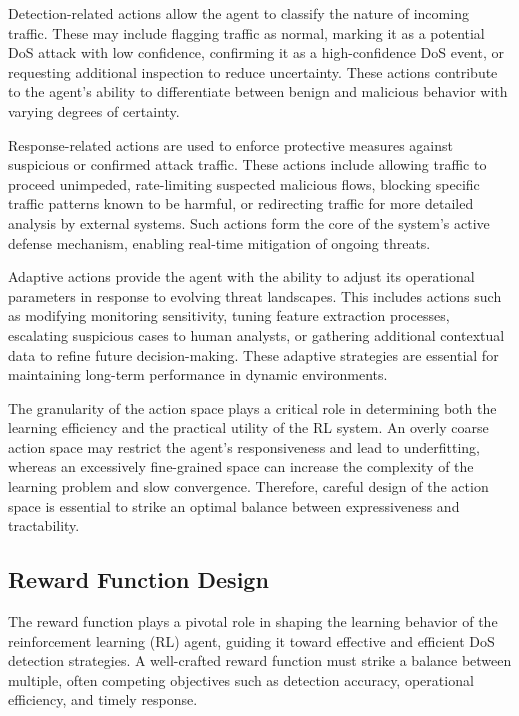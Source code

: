 \documentclass[16pt]{report}
\begin{document}
Detection-related actions allow the agent to classify the nature of incoming traffic. These may include flagging traffic as normal, marking it as a potential DoS attack with low confidence, confirming it as a high-confidence DoS event, or requesting additional inspection to reduce uncertainty. These actions contribute to the agent’s ability to differentiate between benign and malicious behavior with varying degrees of certainty.

Response-related actions are used to enforce protective measures against suspicious or confirmed attack traffic. These actions include allowing traffic to proceed unimpeded, rate-limiting suspected malicious flows, blocking specific traffic patterns known to be harmful, or redirecting traffic for more detailed analysis by external systems. Such actions form the core of the system's active defense mechanism, enabling real-time mitigation of ongoing threats.

Adaptive actions provide the agent with the ability to adjust its operational parameters in response to evolving threat landscapes. This includes actions such as modifying monitoring sensitivity, tuning feature extraction processes, escalating suspicious cases to human analysts, or gathering additional contextual data to refine future decision-making. These adaptive strategies are essential for maintaining long-term performance in dynamic environments.

The granularity of the action space plays a critical role in determining both the learning efficiency and the practical utility of the RL system. An overly coarse action space may restrict the agent's responsiveness and lead to underfitting, whereas an excessively fine-grained space can increase the complexity of the learning problem and slow convergence. Therefore, careful design of the action space is essential to strike an optimal balance between expressiveness and tractability.


\subsection{Reward Function Design}

The reward function plays a pivotal role in shaping the learning behavior of the reinforcement learning (RL) agent, guiding it toward effective and efficient DoS detection strategies. A well-crafted reward function must strike a balance between multiple, often competing objectives such as detection accuracy, operational efficiency, and timely response.
\end{document}
